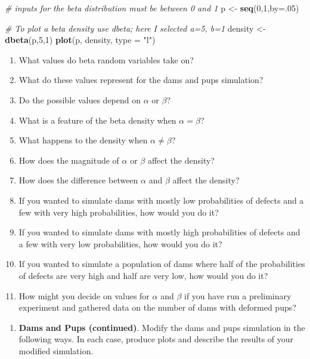 \documentclass[
]{krantz}
\newenvironment{Shaded}{\begin{snugshade}}{\end{snugshade}}
\newcommand{\CommentTok}[1]{\textcolor[rgb]{0.37,0.37,0.37}{\textit{#1}}}
\newcommand{\DataTypeTok}[1]{\textcolor[rgb]{0.27,0.27,0.27}{#1}}
\newcommand{\DecValTok}[1]{\textcolor[rgb]{0.06,0.06,0.06}{#1}}
\newcommand{\KeywordTok}[1]{\textcolor[rgb]{0.27,0.27,0.27}{\textbf{#1}}}
\newcommand{\NormalTok}[1]{#1}
\newcommand{\StringTok}[1]{\textcolor[rgb]{0.5,0.5,0.5}{#1}}
\providecommand{\tightlist}{%
  \setlength{\itemsep}{0pt}\setlength{\parskip}{0pt}}
\begin{document}
\begin{Shaded}
\begin{Highlighting}[]
\CommentTok{# inputs for the beta distribution must be between 0 and 1}
\NormalTok{p <-}\StringTok{ }\KeywordTok{seq}\NormalTok{(}\DecValTok{0}\NormalTok{,}\DecValTok{1}\NormalTok{,}\DataTypeTok{by=}\NormalTok{.}\DecValTok{05}\NormalTok{)  }

\CommentTok{# To plot a beta density use dbeta; here I selected a=5, b=1}
\NormalTok{density <-}\StringTok{ }\KeywordTok{dbeta}\NormalTok{(p,}\DecValTok{5}\NormalTok{,}\DecValTok{1}\NormalTok{)}
\KeywordTok{plot}\NormalTok{(p, density, }\DataTypeTok{type =} \StringTok{"l"}\NormalTok{)}
\end{Highlighting}
\end{Shaded}

\begin{enumerate}
\def\labelenumi{\alph{enumi}.}
\tightlist
\item
  What values do beta random variables take on?
\item
  What do these values represent for the dams and pups simulation?
\item
  Do the possible values depend on \(\alpha\) or \(\beta\)?
\item
  What is a feature of the beta density when \(\alpha=\beta\)?
\item
  What happens to the density when \(\alpha \neq \beta\)?
\item
  How does the magnitude of \(\alpha\) or \(\beta\) affect the density?
\item
  How does the difference between \(\alpha\) and \(\beta\) affect the density?
\item
  If you wanted to simulate dams with mostly low probabilities of defects and a few with very high probabilities, how would you do it?
\item
  If you wanted to simulate dams with mostly high probabilities of defects and a few with very low probabilities, how would you do it?
\item
  If you wanted to simulate a population of dams where half of the probabilities of defects are very high and half are very low, how would you do it?
\item
  How might you decide on values for \(\alpha\) and \(\beta\) if you have run a preliminary experiment and gathered data on the number of dams with deformed pups?
\end{enumerate}

\begin{enumerate}
\def\labelenumi{\arabic{enumi}.}
\setcounter{enumi}{1}
\tightlist
\item
  \textbf{Dams and Pups (continued)}. Modify the dams and pups simulation in the following ways. In each case, produce plots and describe the results of your modified simulation.
\end{enumerate}
\end{document}
